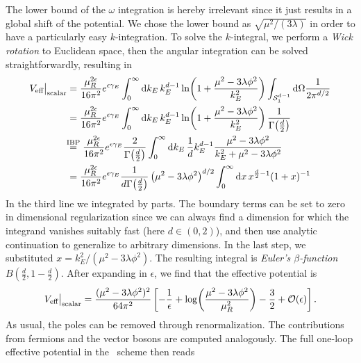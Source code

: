 The lower bound of the $\omega$ integration is hereby irrelevant since it just results in a global shift of the potential. We chose the lower bound as $\sqrt{\mu^2/(3 \lambda)}$ in order to have a particularly easy $k$-integration. To solve the $k$-integral, we perform a \textit{Wick rotation} to Euclidean space, then the angular integration can be solved straightforwardly, resulting in
\begin{equation}
\begin{split}
V_\text{eff}\big \vert_{\text{scalar}} &= \frac{\mu_R^{2 \epsilon}}{16 \pi^2} e^{\epsilon \gamma_E} \int_0^\infty \mathrm{d} k_E\, k_E^{d - 1}\ln\! \left(1 + \frac{\mu^2 - 3 \lambda \phi^2}{k_E^2} \right) \int_{\mathcal{S}_1^{d - 1}} \mathrm{d} \Omega \frac{1}{2 \pi^{d/2}}  \\
& = \frac{\mu_R^{2 \epsilon}}{16 \pi^2} e^{\epsilon \gamma_E} \int_0^\infty \mathrm{d} k_E\, k_E^{d - 1} \ln\! \left(1 + \frac{\mu^2 - 3 \lambda \phi^2}{k_E^2} \right) \frac{1}{\Gamma\! \left(\frac{d}{2} \right)} \\
&\hspace{-1.1mm}\stackrel{\text{IBP}}{=}  \frac{\mu_R^{2 \epsilon}}{16 \pi^2} e^{\epsilon \gamma_E} \frac{2}{\Gamma\! \left(\frac{d}{2} \right)} \int_0^\infty \mathrm{d} k_E\, \frac{1}{d} k_E^{d - 1} \frac{\mu^2 - 3 \lambda \phi^2}{k_E^2 + \mu^2 - 3 \lambda \phi^2} \\
& =  \frac{\mu_R^{2 \epsilon}}{16 \pi^2} e^{\epsilon \gamma_E} \frac{1}{d \Gamma\! \left(\frac{d}{2} \right)} \left(\mu^2 - 3 \lambda \phi^2 \right)^{d/2} \int_0^\infty \mathrm{d} x\, x^{\frac{d}{2} - 1} (1 + x)^{-1}
\end{split}
\end{equation}
In the third line we integrated by parts. The boundary terms can be set to zero in dimensional regularization since we can always find a dimension for which the integrand vanishes suitably fast (here $d \in (0, 2)$), and then use analytic continuation to generalize to arbitrary dimensions. In the last step, we substituted $x = k_E^2/(\mu^2 - 3 \lambda \phi^2)$. The resulting integral is \textit{Euler's $\beta$-function} $B\!\left(\frac{d}{2}, 1 - \frac{d}{2} \right)$. After expanding in $\epsilon$, we find that the effective potential is
\begin{equation}
V_{\text{eff}}\big \vert_{\text{scalar}} = \frac{(\mu^2 - 3 \lambda \phi^2)^2}{64 \pi^2} \left[ - \frac{1}{\epsilon} + \log\! \left( \frac{\mu^2 - 3 \lambda \phi^2}{\mu_R^2} \right) - \frac{3}{2} + \mathcal{O}\!\left(\epsilon\right) \right].
\end{equation}
As usual, the poles can be removed through renormalization. The contributions from fermions and the vector bosons are computed analogously. The full one-loop effective potential in the \MS\ scheme then reads
